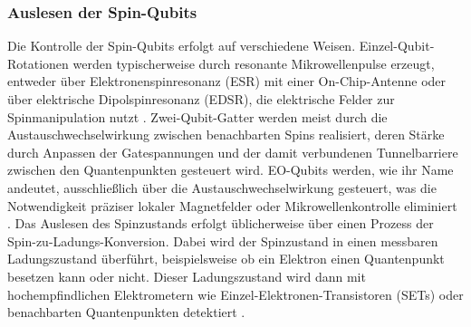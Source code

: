 \subsubsection{Auslesen der Spin-Qubits}
Die Kontrolle der Spin-Qubits erfolgt auf verschiedene Weisen. Einzel-Qubit-Rotationen werden typischerweise durch resonante Mikrowellenpulse erzeugt, entweder über Elektronenspinresonanz (ESR) mit einer On-Chip-Antenne oder über elektrische Dipolspinresonanz (EDSR), die elektrische Felder zur Spinmanipulation nutzt \cite{stuyckCMOSCompatibilitySemiconductor2024}. Zwei-Qubit-Gatter werden meist durch die Austauschwechselwirkung zwischen benachbarten Spins realisiert, deren Stärke durch Anpassen der Gatespannungen und der damit verbundenen Tunnelbarriere zwischen den Quantenpunkten gesteuert wird. EO-Qubits werden, wie ihr Name andeutet, ausschließlich über die Austauschwechselwirkung gesteuert, was die Notwendigkeit präziser lokaler Magnetfelder oder Mikrowellenkontrolle eliminiert \cite{chadwickShortTwoqubitPulse2025}.
Das Auslesen des Spinzustands erfolgt üblicherweise über einen Prozess der Spin-zu-Ladungs-Konversion. Dabei wird der Spinzustand in einen messbaren Ladungszustand überführt, beispielsweise ob ein Elektron einen Quantenpunkt besetzen kann oder nicht. Dieser Ladungszustand wird dann mit hochempfindlichen Elektrometern wie Einzel-Elektronen-Transistoren (SETs) oder benachbarten Quantenpunkten detektiert \cite{stuyckCMOSCompatibilitySemiconductor2024}.

